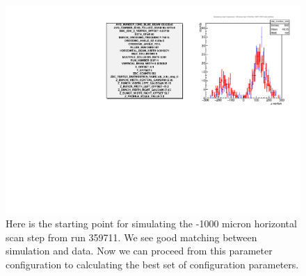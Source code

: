 \begin{figure}
\begin{center}
\includegraphics[width=\linewidth,height=\textheight,keepaspectratio]{./figures/359711_step0_config_compare}
\caption{ 
Here is the starting point for simulating the -1000 micron horizontal scan step
from run 359711. We see good matching between simulation and data. Now we can
proceed from this parameter configuration to calculating the best set of
configuration parameters.
}
\label{fig:359711_step0_config_compare}
\end{center}
\end{figure}
